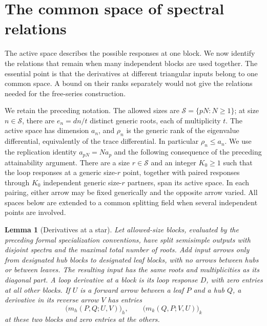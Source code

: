 \documentclass[11pt]{article}
\newtheorem{lemma}[theorem]{Lemma}
\theoremstyle{definition}
\theoremstyle{remark}
\numberwithin{equation}{section}
\begin{document}
\section{The common space of spectral relations}
\label{sec:global-defect}

The active space describes the possible responses at one block. We now
identify the relations that remain when many independent blocks are used
together. The essential point is that the derivatives at different
triangular inputs belong to one common space. A bound on their ranks
separately would not give the relations needed for the free-series
construction.

We retain the preceding notation. The allowed sizes are
\(\mathcal S=\{pN:N\geq1\}\); at size \(n\in\mathcal S\), there are
\(e_n=dn/t\) distinct generic roots, each of multiplicity \(t\).
The active space has dimension \(a_n\), and \(\rho_n\) is the generic
rank of the eigenvalue differential, equivalently of the trace
differential. In particular \(\rho_n\leq a_n\).
We use the replication identity \(a_{pN}=Na_p\) and the following
consequence of the preceding attainability argument. There are a size
\(r\in\mathcal S\) and an integer \(K_0\geq1\) such that the loop
responses at a generic size-\(r\) point, together with paired responses
through \(K_0\) independent generic size-\(r\) partners, span its
active space. In each pairing, either arrow may be fixed generically
and the opposite arrow varied. All spaces below are extended to a
common splitting field when several independent points are involved.

\begin{lemma}[Derivatives at a star]
\label{lem:star-derivatives}
Let allowed-size blocks, evaluated by the preceding formal
specialization conventions, have split semisimple outputs with
disjoint spectra and the maximal total number of roots. Add input
arrows only from designated
hub blocks to designated leaf blocks, with no arrows between hubs or
between leaves. The resulting input has the same roots and
multiplicities as its diagonal part. A loop derivative at a block is
its loop response \(D\), with zero entries at all other blocks. If
\(U\) is a forward arrow between a leaf \(P\) and a hub \(Q\), a
derivative in its reverse arrow \(V\) has entries
\[
 \bigl(m_h(P,Q;U,V)\bigr)_h,
 \qquad
 \bigl(m_k(Q,P;V,U)\bigr)_k
\]
at these two blocks and zero entries at the others.
\end{lemma}
\end{document}
